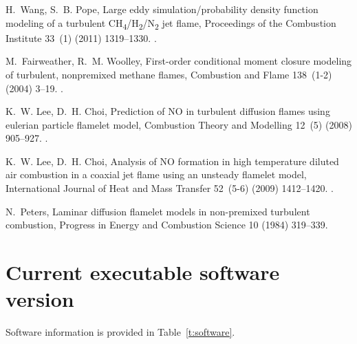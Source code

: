 \documentclass[preprint,12pt, a4paper]{elsarticle}
\begin{document}
\begin{thebibliography}{10}
H.~Wang, S.~B. Pope, Large eddy simulation/probability density function
  modeling of a turbulent
  {CH}\textsubscript{4}/{H}\textsubscript{2}/{N}\textsubscript{2} jet flame,
  Proceedings of the Combustion Institute 33~(1) (2011) 1319--1330.
\newblock \href {http://dx.doi.org/10.1016/j.proci.2010.08.004}
  {}.

M.~Fairweather, R.~M. Woolley, First-order conditional moment closure modeling
  of turbulent, nonpremixed methane flames, Combustion and Flame 138~(1-2)
  (2004) 3--19.
\newblock \href {http://dx.doi.org/10.1016/j.combustflame.2004.03.001}
  {}.

K.~W. Lee, D.~H. Choi, Prediction of {NO} in turbulent diffusion flames using
  eulerian particle flamelet model, Combustion Theory and Modelling 12~(5)
  (2008) 905--927.
\newblock \href {http://dx.doi.org/10.1080/13647830802094351}
  {}.

K.~W. Lee, D.~H. Choi, Analysis of {NO} formation in high temperature diluted
  air combustion in a coaxial jet flame using an unsteady flamelet model,
  International Journal of Heat and Mass Transfer 52~(5-6) (2009) 1412--1420.
\newblock \href {http://dx.doi.org/10.1016/j.ijheatmasstransfer.2008.08.015}
  {}.

N.~Peters, Laminar diffusion flamelet models in non-premixed turbulent
  combustion, Progress in Energy and Combustion Science 10 (1984) 319--339.

\end{thebibliography}














\section*{Current executable software version}
\label{software_version}

Software information is provided in Table~\ref{t:software}.

\end{document}
